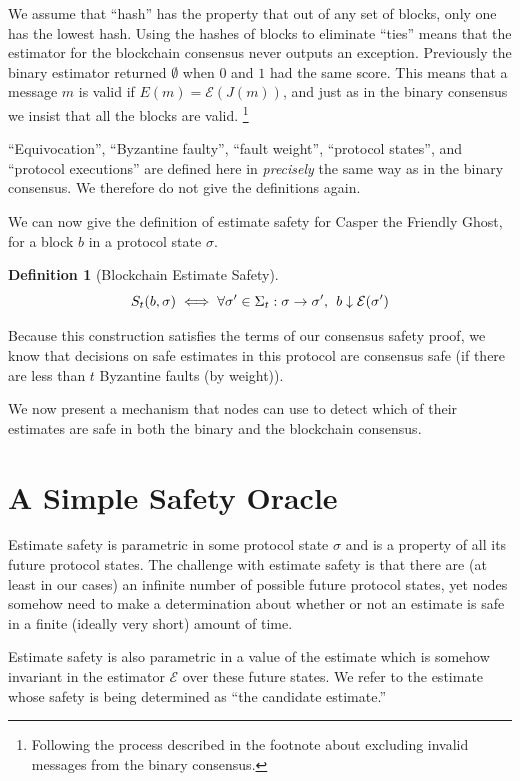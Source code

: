 \documentclass{article}
\theoremstyle{definition}
\newtheorem{defn}{Definition}[section]
\begin{document}
We assume that ``hash'' has the property that out of any set of blocks, only one has the lowest hash. Using the hashes of blocks to eliminate ``ties'' means that the estimator for the blockchain consensus never outputs an exception. Previously the binary estimator returned $\emptyset$ when $0$ and $1$ had the same score. This means that a message $m$ is valid if $E(m) = \mathcal{E}(J(m))$, and just as in the binary consensus we insist that all the blocks are valid. \footnote{Following the process described in the footnote about excluding invalid messages from the binary consensus.}

``Equivocation'', ``Byzantine faulty'', ``fault weight'', ``protocol states'', and ``protocol executions'' are defined here in \emph{precisely} the same way as in the binary consensus. We therefore do not give the definitions again.

We can now give the definition of estimate safety for Casper the Friendly Ghost, for a block $b$ in a protocol state $\sigma$.

\begin{defn}[Blockchain Estimate Safety]
$$
S_t(b, \sigma) \iff \forall \sigma' \in \Sigma_t: \sigma \to \sigma',\hspace{1.5mm} b \downarrow \mathcal{E}(\sigma')
$$
\end{defn}

Because this construction satisfies the terms of our consensus safety proof, we know that decisions on safe estimates in this protocol are consensus safe (if there are less than $t$ Byzantine faults (by weight)).

We now present a mechanism that nodes can use to detect which of their estimates are safe in both the binary and the blockchain consensus.

\section{A Simple Safety Oracle}

Estimate safety is parametric in some protocol state $\sigma$ and is a property of all its future protocol states. The challenge with estimate safety is that there are (at least in our cases) an infinite number of possible future protocol states, yet nodes somehow need to make a determination about whether or not an estimate is safe in a finite (ideally very short) amount of time.

Estimate safety is also parametric in a value of the estimate which is somehow invariant in the estimator $\mathcal{E}$ over these future states. We refer to the estimate whose safety is being determined as ``the candidate estimate.''
\end{document}
